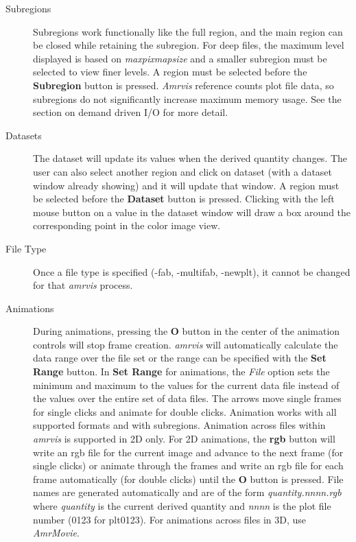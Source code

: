 \begin{description}
\item [Subregions] Subregions work functionally like the full region,
and the main region can be closed while retaining the subregion.
For deep files, the maximum level displayed is based on {\em maxpixmapsize}
and a smaller subregion must be selected to view finer levels.
A region must be selected before the {\bf Subregion} button is pressed.
{\em Amrvis} reference counts plot file data, so subregions do not
significantly increase maximum memory usage.  See the section on
demand driven I/O for more detail.

\item [Datasets]  The dataset will update its values when
the derived quantity changes.  The user can also select another region
and click on dataset (with a dataset window already showing) and it
will update that window.
A region must be selected before the {\bf Dataset} button is
pressed.  Clicking with the left mouse button on a value in the
dataset window will draw a box around the corresponding point in the
color image view.

\item [File Type]
Once a file type is specified (-fab, -multifab, -newplt), it cannot be
changed for that {\em amrvis} process.

\item [Animations] During animations, pressing the {\bf O} button
in the center of the animation controls will stop frame creation.
{\em amrvis} will automatically calculate the data range over
the file set or the range can be specified with the {\bf Set Range} button.
In {\bf Set Range} for animations, the {\em File} option sets
the minimum and maximum to the values for the current data file
instead of the values over the entire set of data files.
The arrows move single frames for single clicks and animate for double clicks.
Animation works with all supported formats and with subregions.
Animation across files within {\em amrvis} is supported in 2D only.
For 2D animations, the {\bf rgb} button will write an rgb file
for the current image and advance to the next frame (for single clicks)
or animate through the frames and write an rgb file for each frame
automatically (for double clicks) until the {\bf O} button is pressed.
File names are generated automatically and are of the form
{\em quantity.nnnn.rgb} where {\em quantity} is the current derived quantity and
{\em nnnn} is the plot file number (0123 for plt0123).
For animations across files in 3D, use {\em AmrMovie}.


\end{description}
